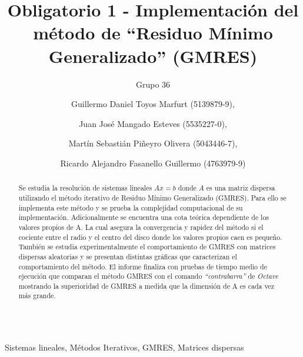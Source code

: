 \documentclass{endm}
\begin{document}
\begin{verbatim}
\end{verbatim}
\vspace{2.5cm}

\begin{frontmatter}

\title{Obligatorio 1 - Implementación del método de “Residuo Mínimo Generalizado” (GMRES)}

\subtitle{Grupo 36}

\author{Guillermo Daniel Toyos Marfurt (5139879-9),}
\author{Juan Jos\'e Mangado Esteves (5535227-0),}
\author{Martín Sebastián Piñeyro Olivera (5043446-7),}
\author{Ricardo Alejandro Fasanello Guillermo (4763979-9)}

\address{Tutor: Juan Piccini}
\address{M\'etodos Num\'ericos 2020\\ Instituto de Matem\'atica y Estad\'istica\\ Facultad de Ingenier\'ia. Universidad de la Rep\'ublica\\ Montevideo, Uruguay}
\begin{abstract}
\setlength{\parindent}{12pt}
Se estudia la resolución de sistemas lineales $Ax=b$ donde $A$ es una matriz dispersa utilizando el método iterativo de Residuo Mínimo Generalizado (GMRES). Para ello se implementa este método y se prueba la complejidad computacional de su implementación. Adicionalmente se encuentra una cota teórica dependiente de los valores propios de A. La cual asegura la convergencia y rapidez del método si el cociente entre el radio y el centro del disco donde los valores propios caen es pequeño. También se estudia experimentalmente el comportamiento de GMRES con matrices dispersas aleatorias y se presentan distintas gráficas que caracterizan el comportamiento del método. El informe finaliza con pruebas de tiempo medio de ejecución que comparan el método GMRES con el comando \textit{“contrabarra”} de \textit{Octave} mostrando la superioridad de GMRES a medida que la dimensión de A es cada vez más grande.
\end{abstract}

\begin{keyword}
Sistemas lineales, Métodos Iterativos, GMRES, Matrices dispersas
\end{keyword}

\end{frontmatter}
\end{document}
